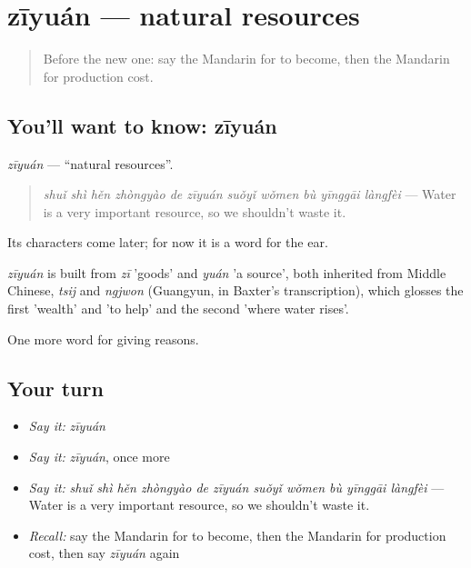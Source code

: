 \section[zīyuán]{zīyuán — natural resources}

\label{lesson:ZH-C384-ziyuan}



\begin{quote}
Before the new one: say the Mandarin for to become, then the Mandarin for production cost.
\end{quote}

\subsection*{You'll want to know: zīyuán}
\emph{zīyuán} — \textquotedblleft{}natural resources\textquotedblright{}.

\begin{quote}
\emph{shuǐ shì hěn zhòngyào de zīyuán suǒyǐ wǒmen bù yīnggāi làngfèi} — Water is a very important resource, so we shouldn't waste it.
\end{quote}

Its characters come later; for now it is a word for the ear.

\begin{cousinweb}
\emph{zīyuán} is built from \emph{zī} 'goods' and \emph{yuán} 'a source', both inherited from Middle Chinese, \emph{tsij} and \emph{ngjwon} (Guangyun, in Baxter's transcription), which glosses the first 'wealth' and 'to help' and the second 'where water rises'.
\end{cousinweb}

\begin{grammarlens}[title={What you've built}]
One more word for giving reasons.
\end{grammarlens}

\subsection*{Your turn}
\begin{itemize}
\raggedright
  \item \emph{Say it:} \emph{zīyuán}
  \item \emph{Say it:} \emph{zīyuán}, once more
  \item \emph{Say it:} \emph{shuǐ shì hěn zhòngyào de zīyuán suǒyǐ wǒmen bù yīnggāi làngfèi} — Water is a very important resource, so we shouldn't waste it.
  \item \emph{Recall:} say the Mandarin for to become, then the Mandarin for production cost, then say \emph{zīyuán} again
\end{itemize}

